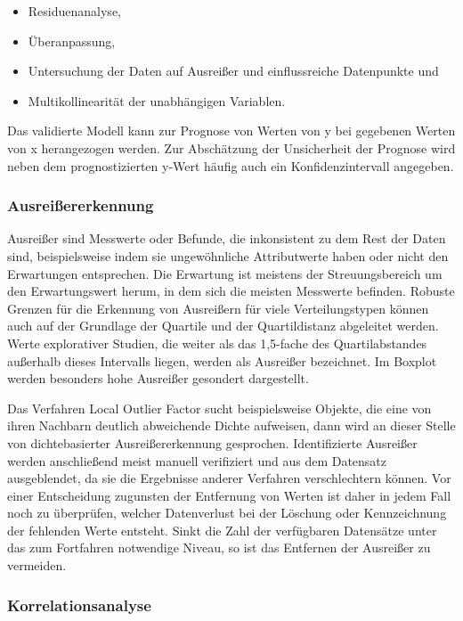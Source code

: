 \begin{itemize}
  \item Residuenanalyse,
  \item Überanpassung,
  \item Untersuchung der Daten auf Ausreißer und einflussreiche Datenpunkte und
  \item Multikollinearität der unabhängigen Variablen.
\end{itemize}	

\bigskip
Das validierte Modell kann zur Prognose von Werten von y bei gegebenen Werten von x herangezogen werden. Zur Abschätzung der Unsicherheit der Prognose wird neben dem prognostizierten y-Wert häufig auch ein Konfidenzintervall angegeben.


\subsubsection{Ausreißererkennung}

Ausreißer sind Messwerte oder Befunde, die inkonsistent zu dem Rest der Daten sind, beispielsweise indem sie ungewöhnliche Attributwerte haben oder nicht den Erwartungen entsprechen. Die Erwartung ist meistens der Streuungsbereich um den Erwartungswert herum, in dem sich die meisten Messwerte befinden. \glqq Robuste Grenzen für die Erkennung von Ausreißern für viele Verteilungstypen können auch auf der Grundlage der Quartile und der Quartildistanz abgeleitet werden.\grqq \cite{Sachs:2006} Werte explorativer Studien, die weiter als das 1,5-fache des Quartilabstandes außerhalb dieses Intervalls liegen, werden als Ausreißer bezeichnet. Im Boxplot werden besonders hohe Ausreißer gesondert dargestellt.

Das Verfahren Local Outlier Factor sucht beispielsweise Objekte, die eine von ihren Nachbarn deutlich abweichende Dichte aufweisen, dann wird an dieser Stelle von dichtebasierter Ausreißererkennung gesprochen. Identifizierte Ausreißer werden anschließend meist manuell verifiziert und aus dem Datensatz ausgeblendet, da sie die Ergebnisse anderer Verfahren verschlechtern können. Vor einer Entscheidung zugunsten der Entfernung von Werten ist daher in jedem Fall noch zu überprüfen, welcher Datenverlust bei der Löschung oder Kennzeichnung der fehlenden Werte entsteht. Sinkt die Zahl der verfügbaren Datensätze unter das zum Fortfahren notwendige Niveau, so ist das Entfernen der Ausreißer zu vermeiden.
	
\subsubsection{Korrelationsanalyse}

